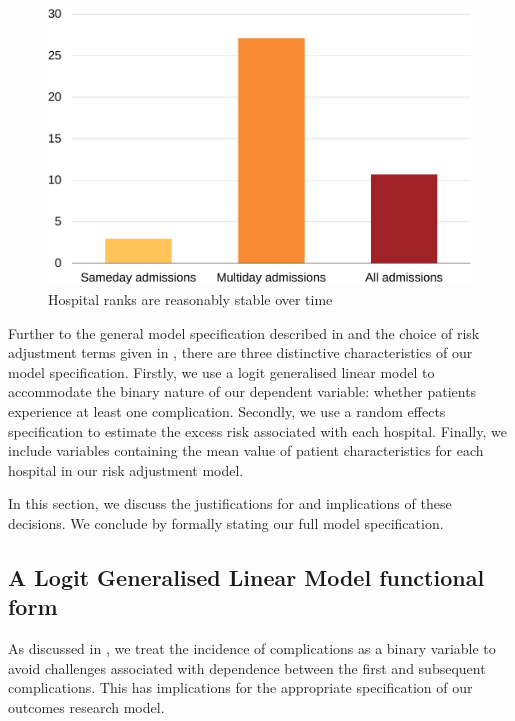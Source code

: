 \documentclass[submission]{grattan}
\begin{document}
\begin{figure}
\caption{Hospital ranks are reasonably stable over time}\label{fig:hospital-ranks-are-reasonably-stable-over-time}
\includegraphics[page=21]{atlas/comps_charts.pdf}
\end{figure}

Further to the general model specification described in  and the choice of risk adjustment terms given in , there are three distinctive characteristics of our model specification.
Firstly, we use a logit generalised linear model to accommodate the binary nature of our dependent variable: whether patients experience at least one complication.
Secondly, we use a random effects specification to estimate the excess risk associated with each hospital.
Finally, we include variables containing the mean value of patient characteristics for each hospital in our risk adjustment model.

In this section, we discuss the justifications for and implications of these decisions.
We conclude by formally stating our full model specification.

\subsection{A Logit Generalised Linear Model functional form}\label{subsec:a-logit-generalised-linear-model-functional-form}

As discussed in , we treat the incidence of complications as a binary variable to avoid challenges associated with dependence between the first and subsequent complications.
This has implications for the appropriate specification of our outcomes research model.
\end{document}
